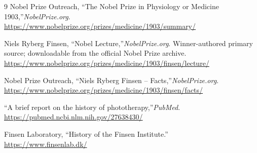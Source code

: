 \begin{thebibliography}{9}
Nobel Prize Outreach, ``The Nobel Prize in Physiology or Medicine 1903,''\emph{NobelPrize.org}.\\
\url{https://www.nobelprize.org/prizes/medicine/1903/summary/}

Niels Ryberg Finsen, ``Nobel Lecture,''\emph{NobelPrize.org}. Winner-authored primary source; downloadable from the official Nobel Prize archive.\\
\url{https://www.nobelprize.org/prizes/medicine/1903/finsen/lecture/}

Nobel Prize Outreach, ``Niels Ryberg Finsen -- Facts,''\emph{NobelPrize.org}.\\
\url{https://www.nobelprize.org/prizes/medicine/1903/finsen/facts/}

``A brief report on the history of phototherapy,''\emph{PubMed}.\\
\url{https://pubmed.ncbi.nlm.nih.gov/27638430/}

Finsen Laboratory, ``History of the Finsen Institute.''\\
\url{https://www.finsenlab.dk/}
\end{thebibliography}
